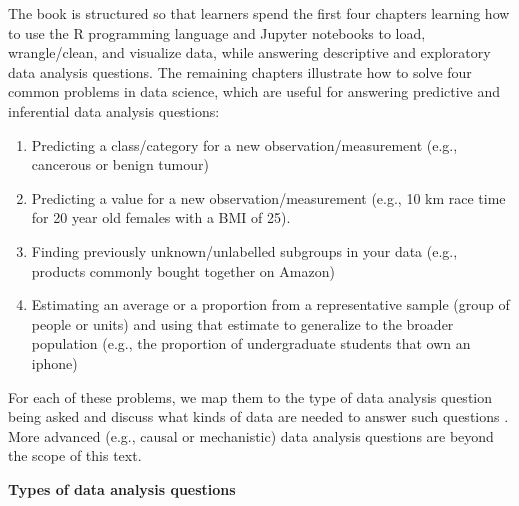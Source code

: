 \documentclass[
]{krantz}
\providecommand{\tightlist}{%
  \setlength{\itemsep}{0pt}\setlength{\parskip}{0pt}}
\begin{document}
The book is structured so that learners spend the first four chapters learning how to use the R programming language and Jupyter notebooks to load, wrangle/clean, and visualize data, while answering descriptive and exploratory data analysis questions. The remaining chapters illustrate how to solve four common problems in data science, which are useful for answering predictive and inferential data analysis questions:

\begin{enumerate}
\def\labelenumi{\arabic{enumi}.}
\tightlist
\item
  Predicting a class/category for a new observation/measurement (e.g., cancerous or benign tumour)
\item
  Predicting a value for a new observation/measurement (e.g., 10 km race time for 20 year old females with a BMI of 25).
\item
  Finding previously unknown/unlabelled subgroups in your data (e.g., products commonly bought together on Amazon)
\item
  Estimating an average or a proportion from a representative sample (group of people or units) and using that estimate to generalize to the broader population (e.g., the proportion of undergraduate students that own an iphone)
\end{enumerate}

For each of these problems, we map them to the type of data analysis question being asked and discuss what kinds of data are needed to answer such questions \citep{leek2015question, peng2015art}. More advanced (e.g., causal or mechanistic) data analysis questions are beyond the scope of this text.

\textbf{Types of data analysis questions}
\end{document}
